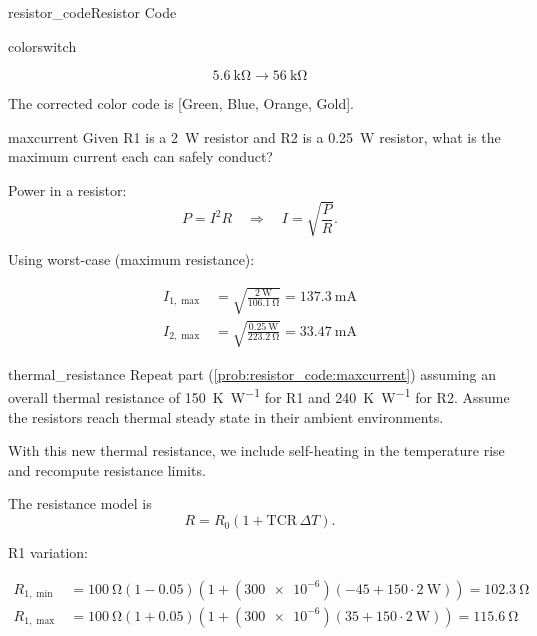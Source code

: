 \begin{mainquestion}{resistor_code}{Resistor Code}
\begin{partquestion}{colorswitch}
\begin{answer}
\[
\qty{5.6}{\kilo\ohm} \rightarrow \qty{56}{\kilo\ohm}
\]

The corrected color code is [Green, Blue, Orange, Gold].
\end{answer}
\end{partquestion}

\begin{partquestion}{maxcurrent}
{Given R1 is a \qty{2}{\watt} resistor and R2 is a \qty{0.25}{\watt} resistor, what is the maximum current each can safely conduct?}

\begin{answer}

Power in a resistor:
\[
P = I^2R
\quad\Rightarrow\quad
I = \sqrt{\frac{P}{R}}.
\]

Using worst-case (maximum resistance):

\begin{align*}
I_{1,\max} &= \sqrt{\frac{\qty{2}{\watt}}{\qty{106.1}{\ohm}}}
= \qty{137.3}{\milli\ampere} \\
I_{2,\max} &= \sqrt{\frac{\qty{0.25}{\watt}}{\qty{223.2}{\ohm}}}
= \qty{33.47}{\milli\ampere}
\end{align*}

\end{answer}
\end{partquestion}

\begin{partquestion}{thermal_resistance}
{Repeat part (\cref{prob:resistor_code:maxcurrent}) assuming an overall thermal resistance of \qty{150}{\kelvin\per\watt} for R1 and \qty{240}{\kelvin\per\watt} for R2. Assume the resistors reach thermal steady state in their ambient environments.}

\begin{answer}

With this new thermal resistance, we include self-heating in the temperature rise and recompute resistance limits.

The resistance model is
\[
R = R_0\left(1 + \mathrm{TCR}\,\Delta T\right).
\]

R1 variation:

\begin{align*}
R_{1,\min} &=
\qty{100}{\ohm}\left(1-\num{0.05}\right)
\left(1+(\num{300e-6})\left(-45 + 150\cdot \qty{2}{\watt}\right)\right)
= \qty{102.3}{\ohm} \\
R_{1,\max} &=
\qty{100}{\ohm}\left(1+\num{0.05}\right)
\left(1+(\num{300e-6})\left(35 + 150\cdot \qty{2}{\watt}\right)\right)
= \qty{115.6}{\ohm}
\end{align*}


\end{answer}
\end{partquestion}
\end{mainquestion}

